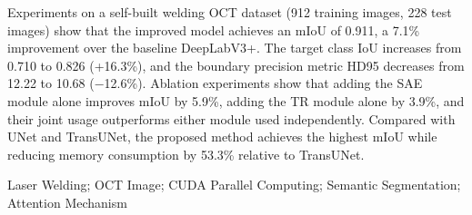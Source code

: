 \begin{abstractEN}
Experiments on a self-built welding OCT dataset (912 training images, 228 test images) show that the improved model achieves an mIoU of 0.911, a 7.1\% improvement over the baseline DeepLabV3+. The target class IoU increases from 0.710 to 0.826 (+16.3\%), and the boundary precision metric HD95 decreases from 12.22 to 10.68 ($-$12.6\%). Ablation experiments show that adding the SAE module alone improves mIoU by 5.9\%, adding the TR module alone by 3.9\%, and their joint usage outperforms either module used independently. Compared with UNet and TransUNet, the proposed method achieves the highest mIoU while reducing memory consumption by 53.3\% relative to TransUNet.

\end{abstractEN}

\begin{keywordEN}
Laser Welding; OCT Image; CUDA Parallel Computing; Semantic Segmentation; Attention Mechanism
\end{keywordEN}

